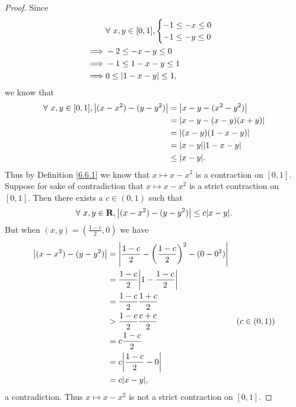 \begin{proof}
    Since
    \begin{align*}
                 & \forall\ x, y \in [0, 1], \begin{cases}
            -1 \leq -x \leq 0 \\
            -1 \leq -y \leq 0
        \end{cases} \\
        \implies & -2 \leq -x - y \leq 0                               \\
        \implies & -1 \leq 1 - x - y \leq 1                            \\
        \implies & 0 \leq \abs*{1 - x - y} \leq 1,
    \end{align*}
    we know that
    \begin{align*}
        \forall\ x, y \in [0, 1], \abs*{(x - x^2) - (y - y^2)} & = \abs*{x - y - (x^2 - y^2)}    \\
                                                               & = \abs*{x - y - (x - y)(x + y)} \\
                                                               & = \abs*{(x - y)(1 - x - y)}     \\
                                                               & = \abs*{x - y} \abs*{1 - x - y} \\
                                                               & \leq \abs*{x - y}.
    \end{align*}
    Thus by Definition \ref{6.6.1} we know that \(x \mapsto x - x^2\) is a contraction on \([0, 1]\).
    Suppose for sake of contradiction that \(x \mapsto x - x^2\) is a strict contraction on \([0, 1]\).
    Then there exists a \(c \in (0, 1)\) such that
    \[
        \forall\ x, y \in \mathbf{R}, \abs*{(x - x^2) - (y - y^2)} \leq c \abs*{x - y}.
    \]
    But when \((x, y) = (\frac{1 - c}{2}, 0)\) we have
    \begin{align*}
        \abs*{(x - x^2) - (y - y^2)} & = \abs*{\frac{1 - c}{2} - \bigg(\frac{1 - c}{2}\bigg)^2 - (0 - 0^2)}                  \\
                                     & = \frac{1 - c}{2} \abs*{1 - \frac{1 - c}{2}}                                          \\
                                     & = \frac{1 - c}{2} \frac{1 + c}{2}                                                     \\
                                     & > \frac{1 - c}{2} \frac{c + c}{2}                                    & (c \in (0, 1)) \\
                                     & = c \frac{1 - c}{2}                                                                   \\
                                     & = c \abs*{\frac{1 - c}{2} - 0}                                                        \\
                                     & = c \abs*{x - y},
    \end{align*}
    a contradiction.
    Thus \(x \mapsto x - x^2\) is not a strict contraction on \([0, 1]\).
\end{proof}

